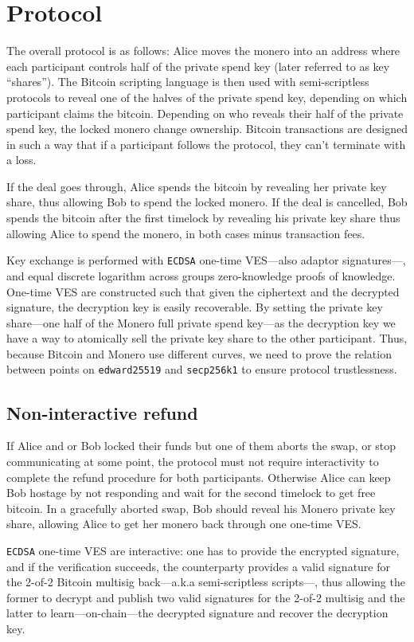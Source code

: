 \documentclass{llncs}
\begin{document}
\section{Protocol}
The overall protocol is as follows: Alice moves the monero into an address where each participant controls half of the private spend key (later referred to as key ``shares''). The Bitcoin scripting language is then used with semi-scriptless protocols to reveal one of the halves of the private spend key, depending on which participant claims the bitcoin. Depending on who reveals their half of the private spend key, the locked monero change ownership. Bitcoin transactions are designed in such a way
that if a participant follows the protocol, they can't terminate with a loss.

If the deal goes through, Alice spends the bitcoin by revealing her private key share, thus allowing Bob to spend the locked monero. If the deal is cancelled, Bob spends the bitcoin after the first timelock by revealing his private key share thus allowing Alice to spend the monero, in both cases minus transaction fees.

Key exchange is performed with \texttt{ECDSA} one-time VES---also adaptor signatures---, and equal discrete logarithm across groups zero-knowledge proofs of knowledge. One-time VES are constructed such that given the ciphertext and the decrypted signature, the decryption key is easily recoverable.
By setting the private key share---one half of the Monero full private spend key---as the decryption key we have a way to atomically sell the private key share to the other participant. Thus, because Bitcoin and Monero use different curves, we need to prove the relation between points on \texttt{edward25519} and \texttt{secp256k1} to ensure protocol trustlessness.

\subsection{Non-interactive refund}
If Alice and or Bob locked their funds but one of them aborts the swap, or stop communicating at some point, the protocol must not require interactivity to complete the refund procedure for both participants. Otherwise Alice can keep Bob hostage by not responding and wait for the second timelock to get free bitcoin. In a gracefully aborted swap, Bob should reveal his Monero private key share, allowing Alice to get her monero back through one one-time VES.

\texttt{ECDSA} one-time VES are interactive: one has to provide the encrypted signature, and if the verification succeeds, the counterparty provides a valid signature for the 2-of-2 Bitcoin multisig back---a.k.a semi-scriptless scripts---, thus allowing the former to decrypt and publish two valid signatures for the 2-of-2 multisig and the latter to learn---on-chain---the decrypted signature and recover the decryption key.
\end{document}
